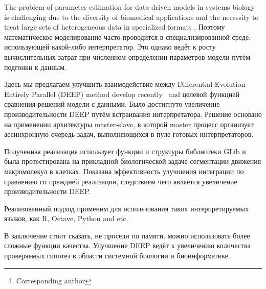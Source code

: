 \documentclass[12pt, a4paper]{article} %
\begin{document}

\renewcommand{\abstractname}{\large \textbf{\uppercase{
    Deep: optimizer with embedded interpreter\\
}}}
\begin{abstract}
    \normalsize %
    \bigskip %
    \noindent A.~V.~Svichkarev\footnote[*]{Corresponding author}, K.~N.~Kozlov \\
    \noindent
    System biology and bioinformatics lab, IAMM,
    Peter the Great St.Petersburg Polytechnic University,
St.Petersburg, Russia \\
    \noindent e-mail: tolik0393@bionet.nsc.ru \\
\end{abstract}

The problem of parameter estimation
for data-driven models in systems biology
is challenging due to the diversity
of biomedical applications and
the necessity to treat large sets of
heterogeneous data in specialized formats \cite{mendes1998non}.
Поэтому математическое моделирование
часто проводится в специализированной среде,
использующей какой-либо интерпретатор.
Это однако ведёт к росту
вычислительных затрат
при численном определении
параметров модели
путём подгонки к данным.

Здесь мы предлагаем улучшить
взаимодействие между
Differential Evolution Entirely Parallel (DEEP)
method develop recently~\cite{Kozlov11}
and целевой функцией сравнения
решений модели с данными.
Было достигнуто увеличение
производительности DEEP
путём встраивания интерпретатора.
Решение основано на применении
архитектуры master-slave,
в которой master процесс
организует ассинхронную очередь задач,
выполняющихся в пуле готовых интерпретаторов.

Полученная реализация использует
функции и структуры библиотеки GLib
и была протестирована
на прикладной биологической задаче
сегментации движения макромолекул в клетках.
Показана эффективность улучшения интеграции
по сравнению со преждней реализации,
следствием чего является
увеличение производительности DEEP.

Реализованный подход применим для использования
таких интерпретируемых языков,
как R, Octave, Python and etc.

В заключение стоит сказать,
не просели по памяти.
можно использовать более сложные функции качества.
Улучшение DEEP ведёт к увеличению
количества проверяемых гипотез
в области системной биологии
и биоинформатике.

\vfill %
\end{document}
